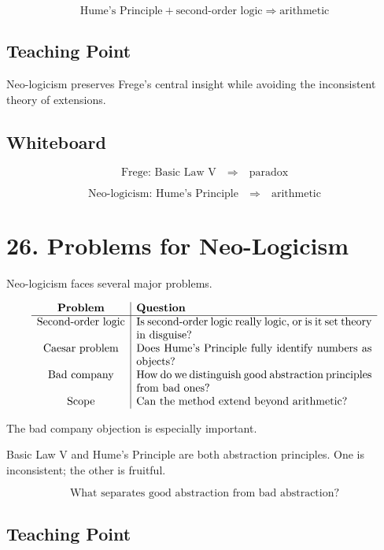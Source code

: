 \documentclass[11pt]{article}
\begin{document}
\[
\text{Hume's Principle}
+
\text{second-order logic}
\Rightarrow
\text{arithmetic}
\]

\subsection*{Teaching Point}

Neo-logicism preserves Frege's central insight while avoiding the inconsistent theory of
extensions.

\subsection*{Whiteboard}

\[
\text{Frege: Basic Law V}
\quad \Rightarrow \quad
\text{paradox}
\]

\[
\text{Neo-logicism: Hume's Principle}
\quad \Rightarrow \quad
\text{arithmetic}
\]

\section*{26. Problems for Neo-Logicism}

Neo-logicism faces several major problems.

\[
\begin{array}{c|p{0.62\textwidth}}
\textbf{Problem} & \textbf{Question} \\
\hline
\text{Second-order logic} &
Is second-order logic really logic, or is it set theory in disguise? \\

\text{Caesar problem} &
Does Hume's Principle fully identify numbers as objects? \\

\text{Bad company} &
How do we distinguish good abstraction principles from bad ones? \\

\text{Scope} &
Can the method extend beyond arithmetic?
\end{array}
\]

The bad company objection is especially important.

Basic Law V and Hume's Principle are both abstraction principles. One is inconsistent; the
other is fruitful.

\[
\text{What separates good abstraction from bad abstraction?}
\]

\subsection*{Teaching Point}
\end{document}
